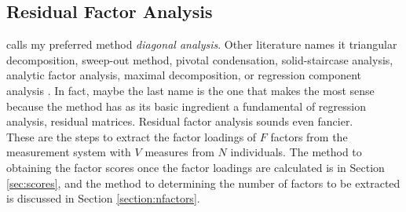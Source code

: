 \subsection{Residual Factor Analysis} \label{section:method}
\citet{gorsuch1983factor} calls my preferred method \textit{diagonal analysis}. Other literature names it triangular decomposition, sweep-out method, pivotal condensation, solid-staircase analysis, analytic factor analysis, maximal decomposition, or regression component analysis \citep[see][Chapter 2]{gorsuch1983factor}. In fact, maybe the last name is the one that makes the most sense because the method has as its basic ingredient a fundamental of regression analysis, residual matrices. Residual factor analysis sounds even fancier.\\
\indent These are the steps to extract the factor loadings of $F$ factors from the measurement system with $V$ measures from $N$ individuals. The method to obtaining the factor scores once the factor loadings are calculated is in Section \ref{sec:scores}, and the method to determining the number of factors to be extracted is discussed in Section \ref{section:nfactors}. 
